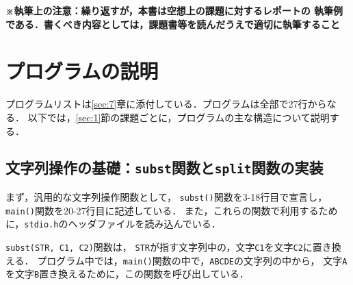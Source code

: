 \textbf{\small※執筆上の注意：繰り返すが，本書は空想上の課題に対するレポートの
    執筆例である．書くべき内容としては，課題書等を読んだうえで適切に執筆すること\\}


\section{プログラムの説明} \label{sec:3}

プログラムリストは\ref{sec:7}章に添付している．プログラムは全部で27行からなる．
以下では，\ref{sec:1}節の課題ごとに，プログラムの主な構造について説明する．

\subsection{文字列操作の基礎：\texttt{subst}関数と\texttt{split}関数の実装}

まず，汎用的な文字列操作関数として，
\verb|subst()|関数を3-18行目で宣言し， %
\verb|main()|関数を20-27行目に記述している．   %
また，これらの関数で利用するために，\verb|stdio.h|のヘッダファイルを読み込んでいる．

\verb|subst(STR, C1, C2)|関数は，
\verb|STR|が指す文字列中の，文字\verb|C1|を文字\verb|C2|に置き換える．
プログラム中では，\verb|main()|関数の中で，\verb|ABCDE|の文字列の中から，
文字\verb|A|を文字\verb|B|置き換えるために，この関数を呼び出している．


